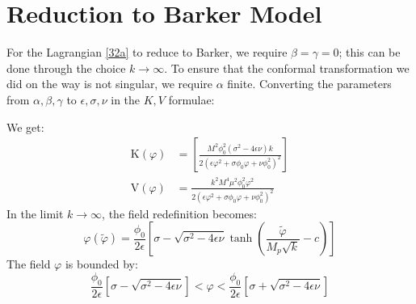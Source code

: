 \documentclass[aps,prd,reprint,preprintnumbers,showpacs,floatfix,nofootinbib,superscript address]{revtex4-2}
\begin{document}
\section{Reduction to Barker Model}
For the Lagrangian \ref{32a} to reduce to Barker, we require $\beta = \gamma =0$; this can be done through the choice $k \rightarrow\infty$. To ensure that the conformal transformation we did on the way is not singular, we require $\alpha$ finite. Converting the parameters from $\alpha, \beta, \gamma$ to $\epsilon, \sigma, \nu$ in the $K,V$ formulae: \cite{caputa_cosmology_2013}

We get:
\begin{align}
    \text{K}(\varphi) &= \left[\frac{M^2 \phi_0^2 (\sigma^2 - 4\epsilon\nu)k}{2 (\epsilon \varphi^2 + \sigma\phi_0\varphi + \nu \phi_0^2)^2}\right] \label{C4}  \\
    \text{V}(\varphi) &= \frac{ k^2 M^4 \mu^2 \phi^2_0 \varphi^2}{2(\epsilon \varphi^2 + \sigma\phi_0\varphi + \nu \phi_0^2)^2}
\end{align}
In the limit $k \rightarrow\infty$, the field redefinition becomes:
\begin{equation}
    \varphi(\tilde{\varphi}) = \frac{\phi_0}{2\epsilon} \left[\sigma - \sqrt{\sigma^2 - 4\epsilon \nu} \tanh\left(\frac{\tilde{\varphi}}{M_p\sqrt{k}}-c \right) \right]
\end{equation}
The field $\varphi$ is bounded by:
\begin{equation}
    \frac{\phi_0}{2\epsilon} \left[\sigma - \sqrt{\sigma^2 - 4\epsilon \nu}\right] < \varphi < \frac{\phi_0}{2\epsilon} \left[\sigma + \sqrt{\sigma^2 - 4\epsilon \nu}  \right]
\end{equation}

\newpage
\,
\newpage
\printbibliography
\end{document}

